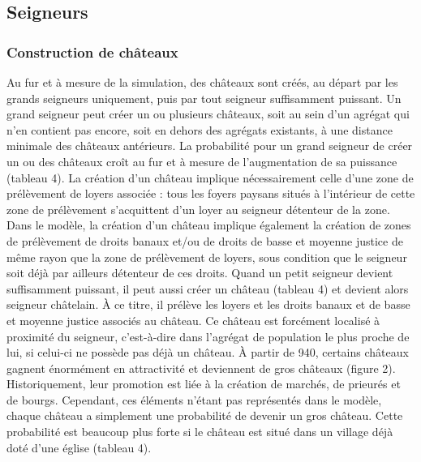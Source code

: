 {\subsection{Seigneurs}

\subsubsection{Construction de châteaux}

Au fur et à mesure de la simulation, des châteaux sont créés, au départ par les grands seigneurs uniquement, puis par tout seigneur suffisamment puissant.
Un grand seigneur peut créer un ou plusieurs châteaux, soit au sein d'un agrégat qui n'en contient pas encore, soit en dehors des agrégats existants, à une distance minimale des châteaux antérieurs.
La probabilité pour un grand seigneur de créer un ou des châteaux croît au fur et à mesure de l'augmentation de sa puissance (tableau 4).
La création d'un château implique nécessairement celle d'une zone de prélèvement de loyers associée :
tous les foyers paysans situés à l'intérieur de cette zone de prélèvement s'acquittent d'un loyer au seigneur détenteur de la zone.
Dans le modèle, la création d'un château implique également la création de zones de prélèvement de droits banaux et/ou de droits de basse et moyenne justice de même rayon que la zone de prélèvement de loyers, sous condition que le seigneur soit déjà par ailleurs détenteur de ces droits.
Quand un petit seigneur devient suffisamment puissant, il peut aussi créer un château (tableau 4) et devient alors seigneur châtelain.
À ce titre, il prélève les loyers et les droits banaux et de basse et moyenne justice associés au château.
Ce château est forcément localisé à proximité du seigneur, c'est-à-dire dans l'agrégat de population le plus proche de lui, si celui-ci ne possède pas déjà un château.
À partir de 940, certains châteaux gagnent énormément en attractivité et deviennent de gros châteaux (figure 2).
Historiquement, leur promotion est liée à la création de marchés, de prieurés et de bourgs.
Cependant, ces éléments n'étant pas représentés dans le modèle, chaque château a simplement une probabilité de devenir un gros château.
Cette probabilité est beaucoup plus forte si le château est situé dans un village déjà doté d'une église (tableau 4).


}
